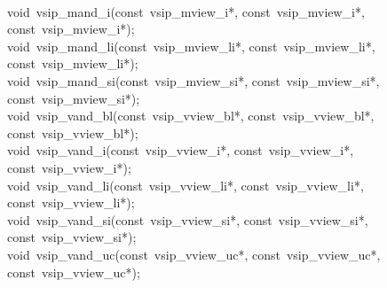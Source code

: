 \\\cvsiplh
\begin{cfuncs}
void~vsip\_mand\_i(const~vsip\_mview\_i*, const~vsip\_mview\_i*, const~vsip\_mview\_i*);\Bs\\
void~vsip\_mand\_li(const~vsip\_mview\_li*, const~vsip\_mview\_li*, const~vsip\_mview\_li*);\Bs\\
void~vsip\_mand\_si(const~vsip\_mview\_si*, const~vsip\_mview\_si*, const~vsip\_mview\_si*);\Bs\\
void~vsip\_vand\_bl(const~vsip\_vview\_bl*, const~vsip\_vview\_bl*, const~vsip\_vview\_bl*);\Bs\\
void~vsip\_vand\_i(const~vsip\_vview\_i*, const~vsip\_vview\_i*, const~vsip\_vview\_i*);\Bs\\
void~vsip\_vand\_li(const~vsip\_vview\_li*, const~vsip\_vview\_li*, const~vsip\_vview\_li*);\Bs\\
void~vsip\_vand\_si(const~vsip\_vview\_si*, const~vsip\_vview\_si*, const~vsip\_vview\_si*);\Bs\\
void~vsip\_vand\_uc(const~vsip\_vview\_uc*, const~vsip\_vview\_uc*, const~vsip\_vview\_uc*);\Bs\\
\end{cfuncs}
\pyjvsiph
%
%
%
